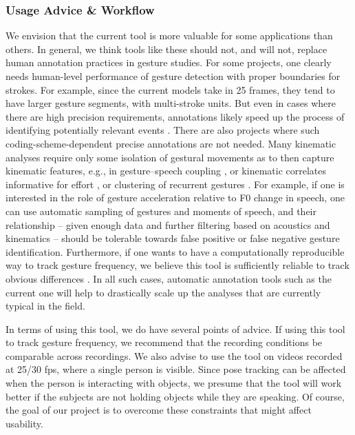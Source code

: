 \documentclass[11pt,smallheadings,cleardoublepage=empty,tocflat,numbers=noenddot,twoside,captions=tableheading]{scrbook}
\begin{document}
\begin{refsection}
\subsubsection{Usage Advice \& Workflow}
We envision that the current tool is more valuable for some applications than others. In general, we think tools like these should not, and will not, replace human annotation practices in gesture studies. For some projects, one clearly needs human-level performance of gesture detection with proper boundaries for strokes. For example, since the current models take in 25 frames, they tend to have larger gesture segments, with multi-stroke units. But even in cases where there are high precision requirements, annotations likely speed up the process of identifying potentially relevant events \parencite{ripperdaSpeedingDetectionNoniconic2020}. There are also projects where such coding-scheme-dependent precise annotations are not needed. Many kinematic analyses require only some isolation of gestural movements as to then capture kinematic features, e.g., in gesture–speech coupling \parencite{wagnerGestureSpeechInteraction2014}, or kinematic correlates informative for effort \parencite{rasenbergMultimodalNatureCommunicative2022}, or clustering of recurrent gestures \parencite{mcneillCatchmentsProsodyDiscourse2001, beecksSpatiotemporalSimilaritySearch2015}. For example, if one is interested in the role of gesture acceleration relative to F0 change in speech, one can use automatic sampling of gestures and moments of speech, and their relationship -- given enough data and further filtering based on acoustics and kinematics -- should be tolerable towards false positive or false negative gesture identification. Furthermore, if one wants to have a computationally reproducible way to track gesture frequency, we believe this tool is sufficiently reliable to track obvious differences \parencite{hogrefeActualPotentialUse2013}. In all such cases, automatic annotation tools such as the current one will help to drastically scale up the analyses that are currently typical in the field.

In terms of using this tool, we do have several points of advice. If using this tool to track gesture frequency, we recommend that the recording conditions be comparable across recordings. We also advise to use the tool on videos recorded at 25/30 fps, where a single person is visible. Since pose tracking can be affected when the person is interacting with objects, we presume that the tool will work better if the subjects are not holding objects while they are speaking. Of course, the goal of our project is to overcome these constraints that might affect usability.


\end{refsection}
\end{document}
